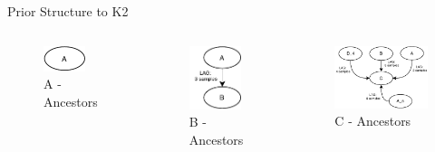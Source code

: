 \begin{frame}{Prior Structure to K2}
    \begin{columns}
                \begin{figure}
                    \includegraphics[height=2em]{figuras/aAnces.pdf}
                    \caption{A -  Ancestors}
                \end{figure}
                \begin{figure}
                    \includegraphics[height=5em]{figuras/bAnces.pdf}
                    \caption{B - Ancestors}
                \end{figure}
               
        \begin{figure}
            \includegraphics[width=\textwidth]{figuras/cVirt.pdf}
            \caption{C - Ancestors}
        \end{figure}
    \end{columns}
\end{frame}

